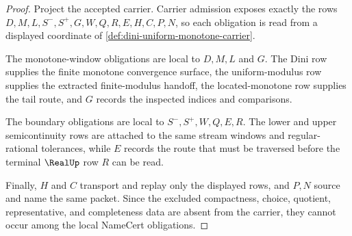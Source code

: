 \begin{proof}
Project the accepted carrier. Carrier admission exposes exactly the rows $D,M,L,S^{-},S^{+},G,W,Q,R,E,H,C,P,N$, so each obligation is read from a displayed coordinate of \autoref{def:dini-uniform-monotone-carrier}.

The monotone-window obligations are local to $D,M,L$ and $G$. The Dini row supplies the finite monotone convergence surface, the uniform-modulus row supplies the extracted finite-modulus handoff, the located-monotone row supplies the tail route, and $G$ records the inspected indices and comparisons.

The boundary obligations are local to $S^{-},S^{+},W,Q,E,R$. The lower and upper semicontinuity rows are attached to the same stream windows and regular-rational tolerances, while $E$ records the route that must be traversed before the terminal $\RealUp$ row $R$ can be read.

Finally, $H$ and $C$ transport and replay only the displayed rows, and $P,N$ source and name the same packet. Since the excluded compactness, choice, quotient, representative, and completeness data are absent from the carrier, they cannot occur among the local NameCert obligations.
\end{proof}


